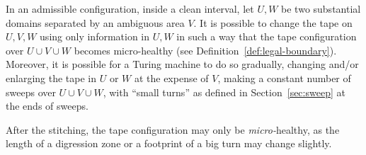 \documentclass[11pt]{memoir}
\theoremstyle{definition} %
\begin{document}
\begin{lemma}[Stitching]\label{lem:stitching}
In an admissible configuration, inside a clean interval,
let \( U,W \) be two substantial domains separated by an ambiguous area \( V \).
It is possible to change the tape on \( U,V,W \) using only information in \( U,W \) in such a 
way that the tape configuration over \( U\cup V\cup W \) becomes
micro-healthy (see Definition~\ref{def:legal-boundary}).
Moreover, it is possible for a Turing machine to do so gradually, changing and/or enlarging
the tape in \( U \) or \( W \) at the expense of \( V \), making a constant number of sweeps
over \( U\cup V\cup W \), with ``small turns'' as defined in Section~\ref{sec:sweep} at the ends of sweeps.
\end{lemma}
After the stitching, the tape configuration may only be \emph{micro-}healthy,
as the length of a digression zone or a footprint of a big turn may change slightly.
\end{document}
